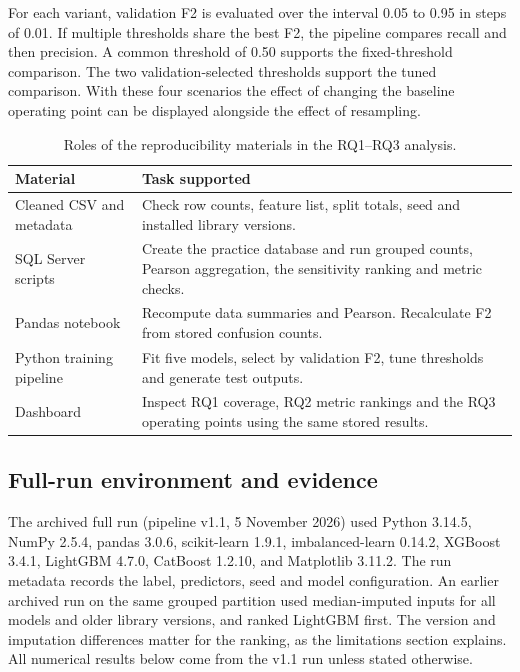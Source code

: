 \documentclass[runningheads]{llncs}
\begin{document}
For each variant, validation F2 is evaluated over the interval 0.05 to 0.95 in steps of 0.01. If multiple thresholds share the best F2, the pipeline compares recall and then precision. A common threshold of 0.50 supports the fixed-threshold comparison. The two validation-selected thresholds support the tuned comparison. With these four scenarios the effect of changing the baseline operating point can be displayed alongside the effect of resampling.

\begin{table}[h]
\caption{Roles of the reproducibility materials in the RQ1--RQ3 analysis.}
\label{tab:replay}
\centering
\begin{tabular}{p{3.4cm}p{7.6cm}}
\toprule
Material & Task supported \\
\midrule
Cleaned CSV and metadata & Check row counts, feature list, split totals, seed and installed library versions. \\
SQL Server scripts & Create the practice database and run grouped counts, Pearson aggregation, the sensitivity ranking and metric checks. \\
Pandas notebook & Recompute data summaries and Pearson. Recalculate F2 from stored confusion counts. \\
Python training pipeline & Fit five models, select by validation F2, tune thresholds and generate test outputs. \\
Dashboard & Inspect RQ1 coverage, RQ2 metric rankings and the RQ3 operating points using the same stored results. \\
\bottomrule
\end{tabular}
\end{table}

\subsection{Full-run environment and evidence}
The archived full run (pipeline v1.1, 5 November 2026) used Python 3.14.5, NumPy 2.5.4, pandas 3.0.6, scikit-learn 1.9.1, imbalanced-learn 0.14.2, XGBoost 3.4.1, LightGBM 4.7.0, CatBoost 1.2.10, and Matplotlib 3.11.2. The run metadata records the label, predictors, seed and model configuration. An earlier archived run on the same grouped partition used median-imputed inputs for all models and older library versions, and ranked LightGBM first. The version and imputation differences matter for the ranking, as the limitations section explains. All numerical results below come from the v1.1 run unless stated otherwise.
\end{document}
